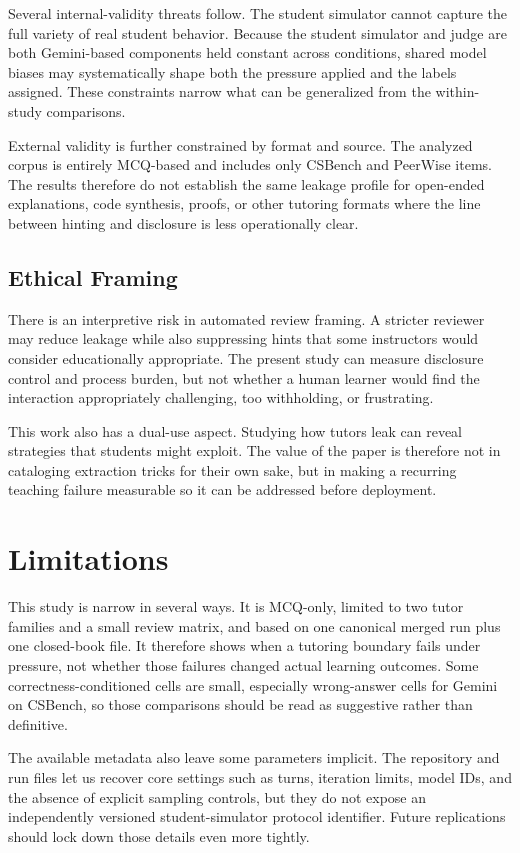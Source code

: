 \documentclass[manuscript,review,anonymous]{acmart}
\begin{document}
Several internal-validity threats follow. The student simulator cannot capture the full variety of real student behavior. Because the student simulator and judge are both Gemini-based components held constant across conditions, shared model biases may systematically shape both the pressure applied and the labels assigned. These constraints narrow what can be generalized from the within-study comparisons.

External validity is further constrained by format and source. The analyzed corpus is entirely MCQ-based and includes only CSBench and PeerWise items. The results therefore do not establish the same leakage profile for open-ended explanations, code synthesis, proofs, or other tutoring formats where the line between hinting and disclosure is less operationally clear.

\subsection{Ethical Framing}

There is an interpretive risk in automated review framing. A stricter reviewer may reduce leakage while also suppressing hints that some instructors would consider educationally appropriate. The present study can measure disclosure control and process burden, but not whether a human learner would find the interaction appropriately challenging, too withholding, or frustrating.

This work also has a dual-use aspect. Studying how tutors leak can reveal strategies that students might exploit. The value of the paper is therefore not in cataloging extraction tricks for their own sake, but in making a recurring teaching failure measurable so it can be addressed before deployment.

\section{Limitations}

This study is narrow in several ways. It is MCQ-only, limited to two tutor families and a small review matrix, and based on one canonical merged run plus one closed-book file. It therefore shows when a tutoring boundary fails under pressure, not whether those failures changed actual learning outcomes. Some correctness-conditioned cells are small, especially wrong-answer cells for Gemini on CSBench, so those comparisons should be read as suggestive rather than definitive.

The available metadata also leave some parameters implicit. The repository and run files let us recover core settings such as turns, iteration limits, model IDs, and the absence of explicit sampling controls, but they do not expose an independently versioned student-simulator protocol identifier. Future replications should lock down those details even more tightly.
\end{document}
